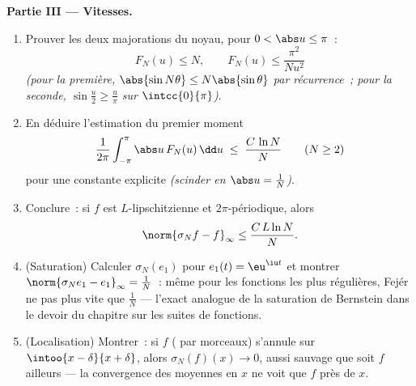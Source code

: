 \begin{problem}
\medskip
\noindent\textbf{Partie III --- Vitesses.}
\begin{enumerate}[resume]
  \item Prouver les deux majorations du noyau, pour $0 < \abs u
        \leq \pi$~:
        \[
        F_N(u) \leq N,
        \qquad
        F_N(u) \leq \frac{\pi^2}{N u^2}
        \]
        \emph{(pour la première, $\abs{\sin N\theta} \leq
        N\abs{\sin\theta}$ par récurrence~; pour la seconde,
        $\sin\frac u2 \geq \frac{u}{\pi}$ sur
        $\intcc{0}{\pi}$)}.
  \item En déduire l'estimation du premier moment
        \[
        \frac{1}{2\pi}\int_{-\pi}^{\pi}\abs u\,F_N(u)\,\dd u
        \;\leq\; \frac{C\,\ln N}{N}
        \qquad (N \geq 2)
        \]
        pour une constante explicite \emph{(scinder en $\abs u =
        \frac1N$)}.
  \item Conclure~: si $f$ est $L$-lipschitzienne et
        $2\pi$-périodique, alors
        \[
        \norm{\sigma_N f - f}_\infty \leq \frac{C\,L\ln N}{N} .
        \]
  \item (Saturation) Calculer $\sigma_N(e_1)$ pour $e_1(t) =
        \eu^{\iu t}$ et montrer $\norm{\sigma_Ne_1 - e_1}_\infty
        = \frac1N$~: même pour les fonctions les plus régulières,
        Fejér ne  pas plus vite que $\frac1N$ --- l'exact
        analogue de la saturation de Bernstein dans le devoir du
        chapitre sur les suites de fonctions.
  \item (Localisation) Montrer~: si $f$ ( par morceaux)
        s'annule sur $\intoo{x - \delta}{x + \delta}$, alors
        $\sigma_N(f)(x) \to 0$, aussi sauvage que soit $f$
        ailleurs --- la convergence des moyennes en $x$ ne voit que
        $f$ près de $x$.
\end{enumerate}


\end{problem}
